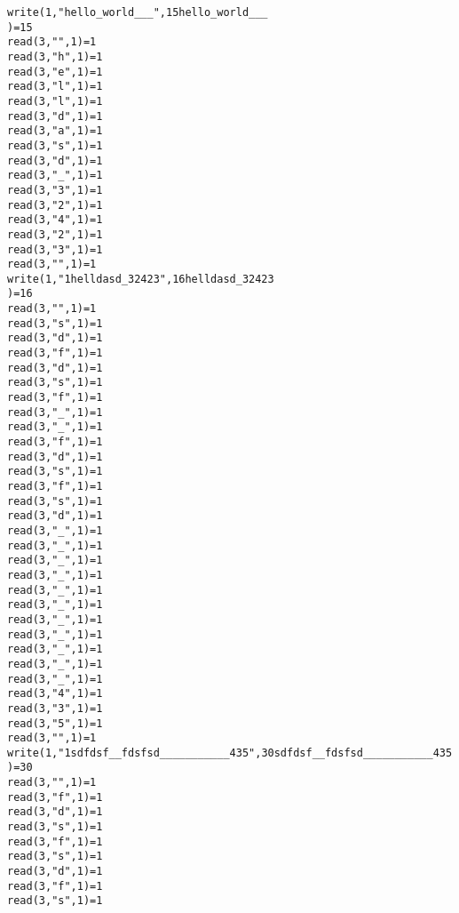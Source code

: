 \documentclass[pdf, unicode, 12pt, a4paper,oneside,fleqn]{article}
\begin{document}
\begin{alltt}
write(1, "hello_world___\n", 15hello_world___
)        = 15
read(3, "", 1)                       = 1
read(3, "h", 1)                         = 1
read(3, "e", 1)                         = 1
read(3, "l", 1)                         = 1
read(3, "l", 1)                         = 1
read(3, "d", 1)                         = 1
read(3, "a", 1)                         = 1
read(3, "s", 1)                         = 1
read(3, "d", 1)                         = 1
read(3, "_", 1)                         = 1
read(3, "3", 1)                         = 1
read(3, "2", 1)                         = 1
read(3, "4", 1)                         = 1
read(3, "2", 1)                         = 1
read(3, "3", 1)                         = 1
read(3, "\n", 1)                        = 1
write(1, "\21helldasd_32423\n", 16helldasd_32423
)     = 16
read(3, "", 1)                       = 1
read(3, "s", 1)                         = 1
read(3, "d", 1)                         = 1
read(3, "f", 1)                         = 1
read(3, "d", 1)                         = 1
read(3, "s", 1)                         = 1
read(3, "f", 1)                         = 1
read(3, "_", 1)                         = 1
read(3, "_", 1)                         = 1
read(3, "f", 1)                         = 1
read(3, "d", 1)                         = 1
read(3, "s", 1)                         = 1
read(3, "f", 1)                         = 1
read(3, "s", 1)                         = 1
read(3, "d", 1)                         = 1
read(3, "_", 1)                         = 1
read(3, "_", 1)                         = 1
read(3, "_", 1)                         = 1
read(3, "_", 1)                         = 1
read(3, "_", 1)                         = 1
read(3, "_", 1)                         = 1
read(3, "_", 1)                         = 1
read(3, "_", 1)                         = 1
read(3, "_", 1)                         = 1
read(3, "_", 1)                         = 1
read(3, "_", 1)                         = 1
read(3, "4", 1)                         = 1
read(3, "3", 1)                         = 1
read(3, "5", 1)                         = 1
read(3, "\n", 1)                        = 1
write(1, "\21sdfdsf__fdsfsd___________435\n", 30sdfdsf__fdsfsd___________435
) = 30
read(3, "", 1)                       = 1
read(3, "f", 1)                         = 1
read(3, "d", 1)                         = 1
read(3, "s", 1)                         = 1
read(3, "f", 1)                         = 1
read(3, "s", 1)                         = 1
read(3, "d", 1)                         = 1
read(3, "f", 1)                         = 1
read(3, "s", 1)                         = 1

\end{alltt}
\end{document}
